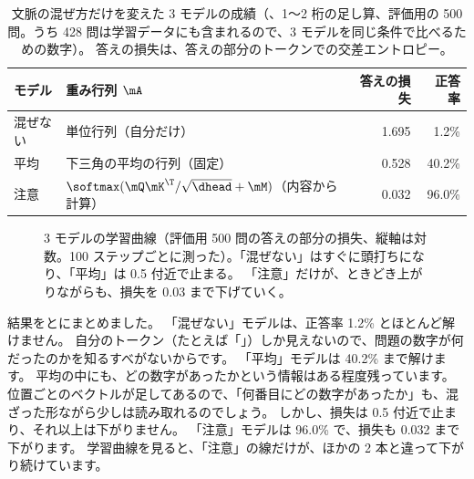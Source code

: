 \begin{table}[tbp]
\centering
\caption{文脈の混ぜ方だけを変えた 3 モデルの成績（、1〜2 桁の足し算、評価用の 500 問。うち 428 問は学習データにも含まれるので、3 モデルを同じ条件で比べるための数字）。
答えの損失は、答えの部分のトークンでの交差エントロピー。}
\label{tab:attn-experiment}
\small
\begin{tabular}{llrr}
\toprule
モデル & 重み行列 $\mA$ & 答えの損失 & 正答率 \\
\midrule
混ぜない & 単位行列（自分だけ） & 1.695 & 1.2\% \\
平均 & 下三角の平均の行列（固定） & 0.528 & 40.2\% \\
注意 & $\softmax(\mQ\mK^\T/\sqrt{\dhead}+\mM)$（内容から計算） & 0.032 & 96.0\% \\
\bottomrule
\end{tabular}
\end{table}

\begin{figure}[tbp]
\centering
{}
\caption{3 モデルの学習曲線（評価用 500 問の答えの部分の損失、縦軸は対数。100 ステップごとに測った）。「混ぜない」はすぐに頭打ちになり、「平均」は 0.5 付近で止まる。
「注意」だけが、ときどき上がりながらも、損失を 0.03 まで下げていく。}
\label{fig:attn-exp-curve}
\end{figure}

結果をとにまとめました。
「混ぜない」モデルは、正答率 1.2\% とほとんど解けません。
自分のトークン（たとえば「\code{=}」）しか見えないので、問題の数字が何だったのかを知るすべがないからです。
「平均」モデルは 40.2\% まで解けます。
平均の中にも、どの数字があったかという情報はある程度残っています。
位置ごとのベクトルが足してあるので、「何番目にどの数字があったか」も、混ざった形ながら少しは読み取れるのでしょう。
しかし、損失は 0.5 付近で止まり、それ以上は下がりません。
「注意」モデルは 96.0\% で、損失も 0.032 まで下がります。
学習曲線を見ると、「注意」の線だけが、ほかの 2 本と違って下がり続けています。

